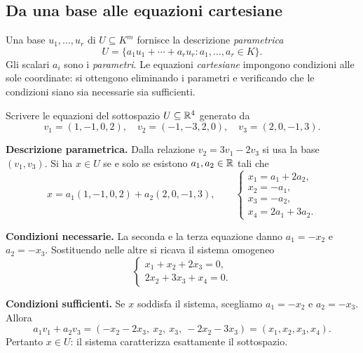 
\subsection{Da una base alle equazioni cartesiane}

Una base $u_1,\ldots,u_r$ di $U\subseteq K^m$ fornisce la descrizione \emph{parametrica}
\[
  U=\{a_1u_1+\cdots+a_ru_r:a_1,\ldots,a_r\in K\}.
\]
Gli scalari $a_i$ sono i \emph{parametri}. Le equazioni \emph{cartesiane} impongono condizioni alle sole coordinate: si ottengono eliminando i parametri e verificando che le condizioni siano sia necessarie sia sufficienti.

\begin{esercizio}
Scrivere le equazioni del sottospazio $U\subseteq\mathbb{R}^4$ generato da
\[
  v_1=(1,-1,0,2),\quad v_2=(-1,-3,2,0),\quad v_3=(2,0,-1,3).
\]
\end{esercizio}

\begin{svolgimento}
\textbf{Descrizione parametrica.} Dalla relazione $v_2=3v_1-2v_3$ si usa la base $(v_1,v_3)$. Si ha $x\in U$ se e solo se esistono $a_1,a_2\in\mathbb{R}$ tali che
\[
  x=a_1(1,-1,0,2)+a_2(2,0,-1,3),\qquad
  \begin{cases}
    x_1=a_1+2a_2,\\
    x_2=-a_1,\\
    x_3=-a_2,\\
    x_4=2a_1+3a_2.
  \end{cases}
\]

\textbf{Condizioni necessarie.} La seconda e la terza equazione danno $a_1=-x_2$ e $a_2=-x_3$. Sostituendo nelle altre si ricava il sistema omogeneo
\[
  \begin{cases}
    x_1+x_2+2x_3=0,\\
    2x_2+3x_3+x_4=0.
  \end{cases}
\]

\textbf{Condizioni sufficienti.} Se $x$ soddisfa il sistema, scegliamo $a_1=-x_2$ e $a_2=-x_3$. Allora
\[
  a_1v_1+a_2v_3=(-x_2-2x_3,\ x_2,\ x_3,\ -2x_2-3x_3)
  =(x_1,x_2,x_3,x_4).
\]
Pertanto $x\in U$: il sistema caratterizza esattamente il sottospazio.
\end{svolgimento}

